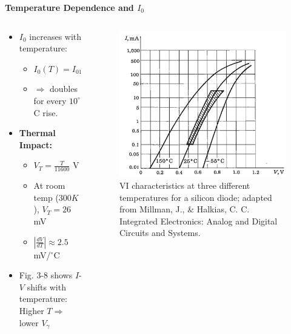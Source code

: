 \begin{frame}{\textbf{Temperature Dependence and $I_0$}}
	\begin{columns}
		\begin{column}{0.5\textwidth}
    \begin{itemize}
        \item $I_0$ increases with temperature:
        \begin{itemize}
            \item $I_0(T) = I_{01} \times 2^{(T - T_1)/10}$
            \item $\Rightarrow$ doubles for every $10^\circ$C rise.
        \end{itemize}
        \item \textbf{Thermal Impact:}
        \begin{itemize}
            \item $V_T = \frac{T}{11600}$ V
            \item At room temp ($300K$), $V_T = 26$ mV
            \item $\left|\frac{dV}{dT}\right| \approx 2.5$ mV/$^\circ$C
        \end{itemize}
        \item Fig. 3-8 shows $I$-$V$ shifts with temperature: Higher $T \Rightarrow$ lower $V_\gamma$
    \end{itemize}
\end{column}
\begin{column}{0.5\textwidth}
	\begin{figure}
		\centering
		\includegraphics[scale=0.225]{fig/lec03/Temp_dependance.png}
		\caption{VI characteristics at three different	temperatures for a silicon
		diode; adapted from Millman, J., \& Halkias, C. C. Integrated Electronics: Analog and Digital Circuits and Systems.}
		\label{fig:temp_Si_diode_characteristics}
	\end{figure}
	\end{column}
	\end{columns}
\end{frame}

